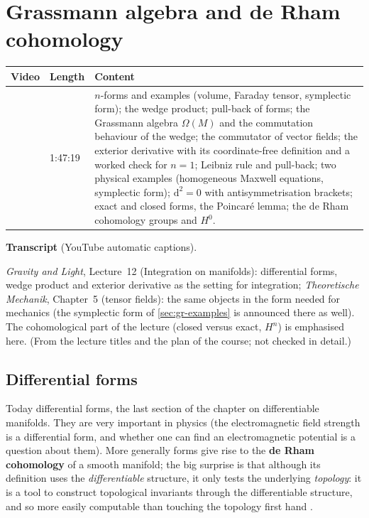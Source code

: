 \chapter{Grassmann algebra and de Rham cohomology}\label{ch:l12}
\begin{paracol}{2}

\begin{sources}
\begin{tabularx}{\linewidth}{@{}l l L@{}}
\toprule
\textbf{Video} & \textbf{Length} & \textbf{Content}\\
\midrule
{} & 1:47:19 & $n$-forms and examples (volume, Faraday tensor, symplectic form); the wedge product; pull-back of forms; the Grassmann algebra $\Omega(M)$ and the commutation behaviour of the wedge; the commutator of vector fields; the exterior derivative with its coordinate-free definition
and a worked check for $n=1$; Leibniz rule and pull-back; two physical examples (homogeneous Maxwell equations, symplectic form); $\mathrm d^2=0$ with antisymmetrisation brackets; exact and closed forms, the Poincar\'e lemma; the de Rham cohomology groups and $H^0$.\\
\bottomrule
\end{tabularx}

\smallskip
\textbf{Transcript}  (YouTube automatic captions).
\end{sources}

\begin{reading}
\emph{Gravity and Light}, Lecture~12 (Integration on manifolds): differential forms, wedge product and exterior derivative as the setting for integration; \emph{Theoretische Mechanik}, Chapter~5 (tensor fields): the same objects in the form needed for mechanics (the symplectic form of \cref{sec:gr-examples} is
announced there as well). The cohomological part of the lecture (closed versus exact, $H^n$) is emphasised here. (From the lecture titles and the plan of the course; not checked in detail.)
\end{reading}

\section{Differential forms}\label{sec:gr-forms}

Today differential forms, the last section of the chapter on differentiable manifolds. They are very important in physics (the electromagnetic field strength is a differential form, and whether one can find an electromagnetic potential is a question about them). More generally forms give rise to the \textbf{de Rham cohomology} of a smooth manifold; the big surprise is that although its definition uses the
\emph{differentiable} structure, it only tests the underlying \emph{topology}: it is a tool to construct topological invariants through the differentiable structure, and so more easily computable than touching the topology first hand     .


\end{paracol}
